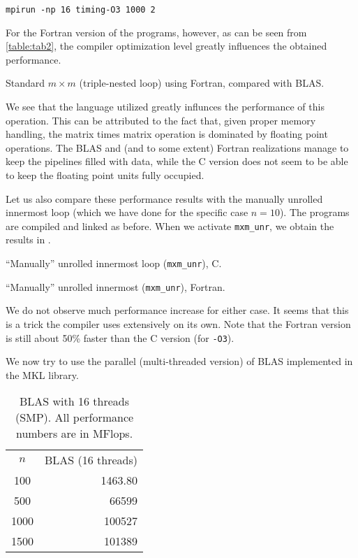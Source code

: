 \begin{lstlisting}[style=shell]
  mpirun -np 16 timing-O3 1000 2
\end{lstlisting}

For the Fortran version of the programs, however, as can be seen from
\autoref{table:tab2}, the compiler optimization level greatly influences the
obtained performance.

\begin{table}
  \caption{
    Standard $m \times m$ (triple-nested loop) using Fortran, compared with
    BLAS.
  }
  \label{table:tab2}
  
\end{table}

We see that the language utilized greatly influnces the performance of this
operation. This can be attributed to the fact that, given proper memory
handling, the matrix times matrix operation is dominated by floating point
operations. The BLAS and (and to some extent) Fortran realizations manage to
keep the pipelines filled with data, while the C version does not seem to be
able to keep the floating point units fully occupied.

Let us also compare these performance results with the manually unrolled
innermost loop (which we have done for the specific case $n=10$). The programs
are compiled and linked as before. When we activate \texttt{mxm\_unr}, we obtain
the results in .

\begin{table}
  \caption{``Manually'' unrolled innermost loop (\texttt{mxm\_unr}), C.}
  \label{table:convergence_C}
  
\end{table}

\begin{table}
  \caption{``Manually'' unrolled innermost (\texttt{mxm\_unr}), Fortran.}
  \label{table:convergence_F}
  
\end{table}

We do not observe much performance increase for either case. It seems that this is a trick
the compiler uses extensively on its own. Note that the Fortran version is still
about 50\% faster than the C version (for \texttt{-O3}).

We now try to use the parallel (multi-threaded version) of BLAS implemented in
the MKL library.
\begin{table}
  \caption{BLAS with 16 threads (SMP). All performance numbers are in MFlops.}
  \label{table:tab4}
  \begin{center}
    \bgroup{}
    \begin{tabular}{cr}
      \hline
      $n$ & BLAS (16 threads) \\
      \hhline{==}
      100 & 1463.80 \\
      500 & 66599 \\
      1000 & 100527 \\
      1500 & 101389 \\
      \hline
    \end{tabular}
    \egroup
  \end{center}
\end{table}

